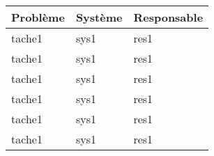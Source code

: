 \begin{tabularx}{\linewidth}{
    |>{\hsize=2.0\hsize}X|%
    >{\hsize=0.5\hsize}X|%
    >{\hsize=0.5\hsize}X|%
  }
    \hline
    Problème & Système & Responsable \\\hline
    tache1 & sys1 & res1 \\\hline
    tache1 & sys1 & res1 \\\hline
    tache1 & sys1 & res1 \\\hline
    tache1 & sys1 & res1 \\\hline
    tache1 & sys1 & res1 \\\hline
    tache1 & sys1 & res1 \\\hline
  \end{tabularx}
     